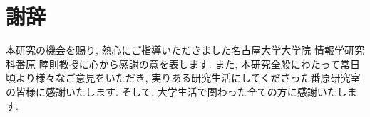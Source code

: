 \chapter*{謝辞}

本研究の機会を賜り, 熱心にご指導いただきました名古屋大学大学院
情報学研究科番原 睦則教授に心から感謝の意を表します. 
また, 本研究全般にわたって常日頃より様々なご意見をいただき, 
実りある研究生活にしてくださった番原研究室の皆様に感謝いたします. 
そして, 大学生活で関わった全ての方に感謝いたします. 

